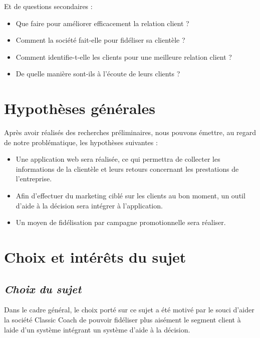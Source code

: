     Et de questions secondaires :
    \par
        \begin{itemize}
            \setlength{\itemsep}{0pt}
            \item [\ding{226}] Que faire pour améliorer efficacement la relation client ?
            \item [\ding{226}] Comment la société fait-elle pour fidéliser sa clientèle ?
            \item [\ding{226}] Comment identifie-t-elle les clients pour une
            meilleure relation client ?
            \item [\ding{226}] De quelle manière sont-ils à l’écoute de leurs clients ?
        \end{itemize}
    \section[Hypothèses générales]{Hypothèses générales}
    Après avoir réalisés des recherches préliminaires, nous pouvons émettre, au regard
    de notre problématique, les hypothèses suivantes :
    \par
        \begin{itemize}
            \setlength{\itemsep}{0pt}
            \item [\ding{226}] Une application web sera réalisée, ce qui permettra de collecter
            les informations de la clientèle et leurs retours concernant les prestations de l’entreprise.
            \item [\ding{226}] Afin d’effectuer du marketing ciblé sur les clients au bon moment,
            un outil d’aide à la décision sera intégrer à l’application.
            \item [\ding{226}] Un moyen de fidélisation par campagne promotionnelle sera réaliser.
        \end{itemize}
    \section[Choix et interet du sujet]{Choix et intérêts du sujet}
        \subsection[Choix du sujet]{\textit{Choix du sujet}}
        Dans le cadre général, le choix porté sur ce sujet a été motivé par le souci d’aider
        la société Classic Coach de pouvoir fidéliser plus aisément le segment client à laide d’un
        système intégrant un système d’aide à la décision.
